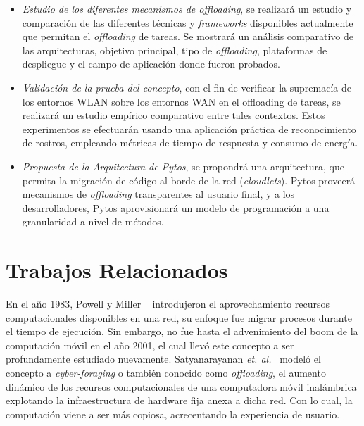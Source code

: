 \begin{itemize}
 \item \textit{Estudio de los diferentes mecanismos de \textit{offloading}}, se realizará un estudio y comparación de las diferentes técnicas 
 y \textit{frameworks} disponibles actualmente que permitan el \textit{offloading} de tareas. 
 Se mostrará un análisis comparativo de las arquitecturas, objetivo principal, tipo de \textit{offloading}, plataformas de despliegue y el 
 campo de aplicación donde fueron probados.
 \item \textit{Validación de la prueba del concepto}, con el fin de verificar la supremacía de los entornos WLAN sobre los entornos 
 WAN en el offloading de tareas, se realizará un estudio empírico comparativo entre tales contextos. Estos experimentos se efectuarán usando
 una aplicación práctica de reconocimiento de rostros, empleando métricas de tiempo de respuesta y consumo de energía.  
 
 \item \textit{Propuesta de la Arquitectura de Pytos}, se propondrá una arquitectura, que permita la migración 
 de código al borde de la red (\textit{cloudlets}). Pytos proveerá mecanismos de \textit{offloading} transparentes al usuario final, y a los 
 desarrolladores, Pytos aprovisionará un modelo de programación a una granularidad a nivel de métodos. 
 
\end{itemize}

\section{Trabajos Relacionados}
\label{sec:relatedWork}

En el año 1983, Powell y Miller ~\cite{Powell:CSD-83-132} introdujeron el aprovechamiento recursos computacionales disponibles en una red, 
su enfoque fue migrar procesos durante el tiempo de ejecución. Sin embargo, no fue hasta el advenimiento del boom de la computación móvil en
el año 2001, el cual llevó este concepto a ser profundamente estudiado nuevamente. Satyanarayanan {\em et. al.}~\cite{943998} modeló
el concepto a \textit{cyber-foraging} o también conocido como \textit{offloading}, el aumento dinámico de los recursos computacionales 
de una computadora móvil inalámbrica explotando la infraestructura de hardware fija anexa a dicha red. Con lo cual, la computación viene a ser
más copiosa, acrecentando la experiencia de usuario.  


